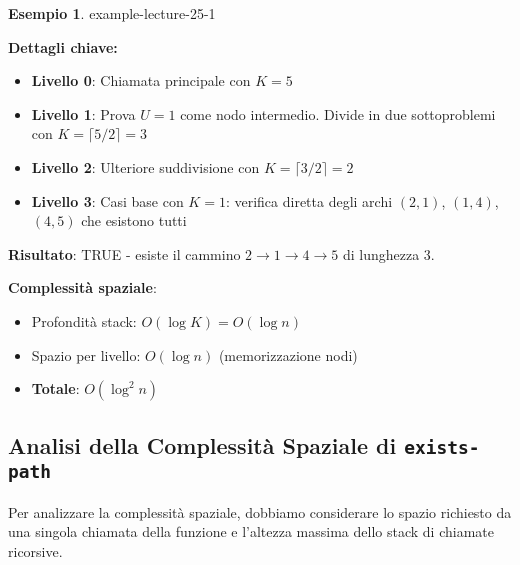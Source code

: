 \documentclass[a4paper]{article}
\theoremstyle{definition} %
\newtheorem{example}{Esempio}
\begin{document}
\begin{example}{}{{ example-lecture-25-1 }}
\begin{center}
\end{center}

\textbf{Dettagli chiave:}
\begin{itemize}
\item \textbf{Livello 0}: Chiamata principale con $K=5$
\item \textbf{Livello 1}: Prova $U=1$ come nodo intermedio. Divide in due sottoproblemi con $K=\lceil 5/2 \rceil = 3$
\item \textbf{Livello 2}: Ulteriore suddivisione con $K=\lceil 3/2 \rceil = 2$
\item \textbf{Livello 3}: Casi base con $K=1$: verifica diretta degli archi $(2,1)$, $(1,4)$, $(4,5)$ che esistono tutti
\end{itemize}

\textbf{Risultato}: TRUE - esiste il cammino $2 \to 1 \to 4 \to 5$ di lunghezza 3.

\textbf{Complessità spaziale}: 
\begin{itemize}
\item Profondità stack: $O(\log K) = O(\log n)$
\item Spazio per livello: $O(\log n)$ (memorizzazione nodi)
\item \textbf{Totale}: $O(\log^2 n)$
\end{itemize}
\end{example}

\subsection{Analisi della Complessità Spaziale di \texttt{exists-path}}
Per analizzare la complessità spaziale, dobbiamo considerare lo spazio richiesto da una singola chiamata della funzione e l'altezza massima dello stack di chiamate ricorsive.
\end{document}

